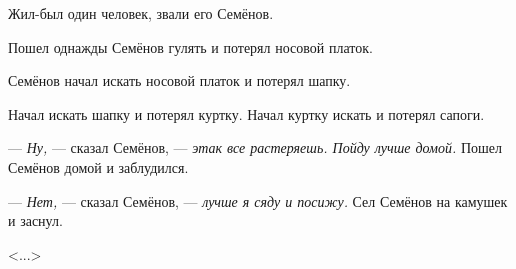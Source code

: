 Жил-был один человек, звали его Семёнов.

Пошел однажды Семёнов гулять и потерял носовой платок.

Семёнов начал искать носовой платок и потерял шапку.

Начал искать шапку и потерял куртку. Начал куртку искать и потерял сапоги.

--- \textit{Ну,} --- сказал Семёнов, --- \textit{этак все растеряешь. Пойду лучше домой.} Пошел Семёнов домой и заблудился.

--- \textit{Нет,} --- сказал Семёнов, --- \textit{лучше я сяду и посижу.}
Сел Семёнов на камушек и заснул.

\vspace{0.5em}
\hfill \textless ...\textgreater